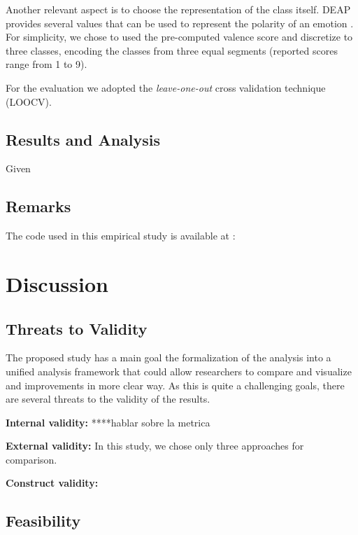 \documentclass{sig-alternate}
\begin{document}
Another relevant aspect is to choose the representation of the class itself. DEAP provides several  values that can be used to 
represent the polarity of an emotion . For simplicity, we chose to used 
the pre-computed valence score  and discretize to three classes, 
encoding the classes from three equal segments (reported scores
range from 1 to 9). 

For the evaluation we adopted the \emph{leave-one-out} cross validation technique (LOOCV).




\subsection{ Results and Analysis}

Given 



\subsection{Remarks}



The code used in this empirical study is available at : 

\section{Discussion}
\label{discussion}

\subsection{Threats to Validity}

The proposed  study has a main goal the formalization
of the analysis into a unified analysis framework 
that could allow researchers to compare and
visualize and improvements in more clear way. 
As this is quite a challenging goals, there are several
threats to the validity of the results. 

\textbf{Internal validity: }  ****hablar sobre la metrica

\textbf{External validity: } In this study, we chose only three approaches
for comparison. 

\textbf{ Construct validity: } 


\subsection{Feasibility}

\end{document}
